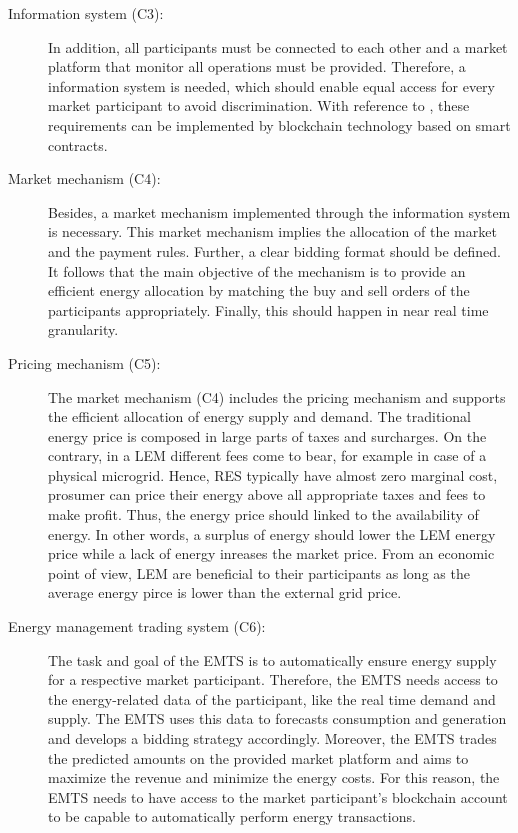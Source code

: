 \begin{description}
    \item[Information system (C3):] In addition, all participants must be connected to each other
    and a market platform that monitor all operations must be provided. 
    Therefore, a information system is needed, which should enable equal 
    access for every market participant to avoid discrimination. 
    With reference to , these requirements
    can be implemented by blockchain technology based on smart contracts.
    
    \item[Market mechanism (C4):] Besides, a market mechanism implemented through 
     the information system is necessary. This market mechanism implies the allocation of the
     market and the payment rules. Further, a clear bidding format should be defined. 
     It follows that the main objective of the mechanism is to provide an efficient
     energy allocation by matching the buy and sell orders of the participants appropriately.
     Finally, this should happen in near real time granularity.    
    
    \item[Pricing mechanism (C5):] The market mechanism (C4) includes the pricing mechanism 
     and supports the efficient allocation of energy supply and demand. 
     The traditional energy price is composed in large parts of taxes and surcharges.
     On the contrary, in a LEM different fees come to bear, for example in case of a 
     physical microgrid. Hence, RES typically have almost zero marginal cost, prosumer can 
     price their energy above all appropriate taxes and fees to make profit. 
    Thus, the energy price should linked to the availability of energy. In other words,
    a surplus of energy should lower the LEM energy price while a lack of energy inreases the 
    market price. From an economic point of view, LEM are beneficial to their 
    participants as long as the average energy pirce is lower than the external grid price.
        
    \item[Energy management trading system (C6):] The task and goal of the EMTS
     is to automatically ensure energy supply for a respective market participant.
     Therefore, the EMTS needs access to the energy-related data of the participant, like 
     the real time demand and supply. The EMTS uses this data to forecasts consumption and
     generation and develops a bidding strategy accordingly. 
     Moreover, the EMTS trades the predicted amounts on the provided market platform 
     and aims to maximize the revenue and minimize the energy costs. 
     For this reason, the EMTS needs to have access to the market participant’s
     blockchain account to be capable to automatically perform energy transactions.


\end{description}

